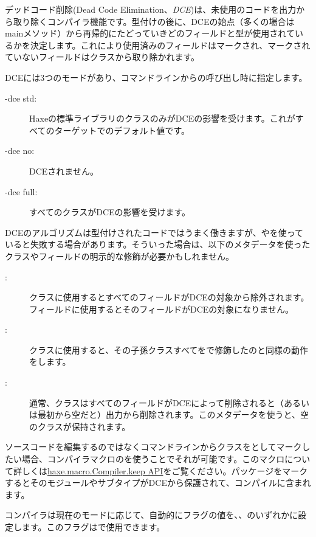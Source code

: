 デッドコード削除(Dead Code Elimination、\emph{DCE})は、未使用のコードを出力から取り除くコンパイラ機能です。型付けの後に、DCEの始点（多くの場合はmainメソッド）から再帰的にたどっていきどのフィールドと型が使用されているかを決定します。これにより使用済みのフィールドはマークされ、マークされていないフィールドはクラスから取り除かれます。

DCEには3つのモードがあり、コマンドラインからの呼び出し時に指定します。

\begin{description}
	\item[-dce std:] Haxeの標準ライブラリのクラスのみがDCEの影響を受けます。これがすべてのターゲットでのデフォルト値です。
	\item[-dce no:] DCEされません。
	\item[-dce full:] すべてのクラスがDCEの影響を受けます。
\end{description}
DCEのアルゴリズムは型付けされたコードではうまく働きますが、やを使っていると失敗する場合があります。そういった場合は、以下のメタデータを使ったクラスやフィールドの明示的な修飾が必要かもしれません。

\begin{description}
	\item[:] クラスに使用するとすべてのフィールドがDCEの対象から除外されます。フィールドに使用するとそのフィールドがDCEの対象になりません。
	\item[:] クラスに使用すると、その子孫クラスすべてをで修飾したのと同様の動作をします。
	\item[:] 通常、クラスはすべてのフィールドがDCEによって削除されると（あるいは最初から空だと）出力から削除されます。このメタデータを使うと、空のクラスが保持されます。
\end{description}

ソースコードを編集するのではなくコマンドラインからクラスをとしてマークしたい場合、コンパイラマクロのを使うことでそれが可能です。このマクロについて詳しくは\href{http://api.haxe.org/haxe/macro/Compiler.html#keep}{haxe.macro.Compiler.keep API}をご覧ください。パッケージをマークするとそのモジュールやサブタイプがDCEから保護されて、コンパイルに含まれます。

コンパイラは現在のモードに応じて、自動的にフラグの値を、、のいずれかに設定します。このフラグはで使用できます。

